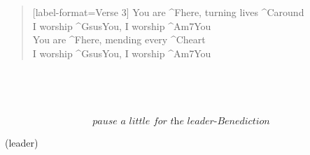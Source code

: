 \begin{verse}[label-format={Verse 3}]
  You are ^{F}here, turning lives ^{C}around \\ I worship ^{Gsus}You, I worship ^{Am7}You \\
  You are ^{F}here, mending every ^{C}heart  \\ I worship ^{Gsus}You, I worship ^{Am7}You
\end{verse}

\begin{chorus}
  \uqonid{} \\
  \uqonid{}
\end{chorus}

\begin{refrain}
  \ihmfyl{} \\
  \ihmfyl{}
\end{refrain}

\[\textit{pause a little for the leader-Benediction}\]

\begin{bridge}[format={\sffamily \itshape}]
  (leader) \\
  \ldfjft{} \\
  \ldfjft{}
\end{bridge}

\begin{together}
  \ldfjft{} \\
  \ldfjft{}
\end{together}

\begin{chorus}
  \uqonid{} \\
  \uqonid{}
\end{chorus}

\begin{outro}
  \ihmfyl{} \\
  \ihmfyl{}
\end{outro}

\begin{acappella}
  \ihmfyl{} \\
  \ihmfyl{}
\end{acappella}
